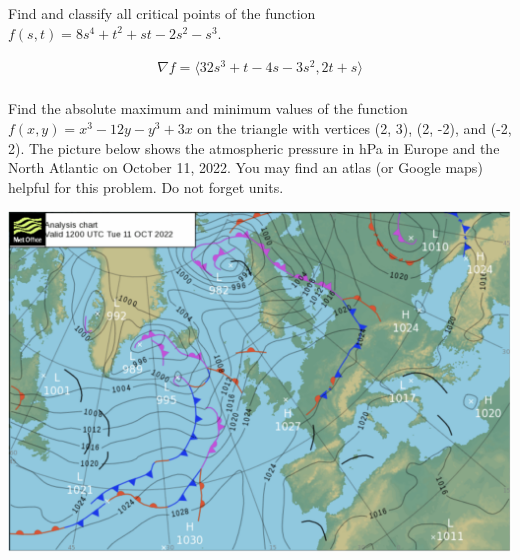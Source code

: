 \documentclass[12pt]{exam}
\begin{document}
\begin{questions}
\question Find and classify all critical points of the function $f (s, t) = 8s^4 + t^2 + st - 2s^2 - s^3$.
	\begin{solution}
		\begin{gather*}
			\nabla f = \langle 32s^3 + t - 4s - 3s^2, 2t + s \rangle \\
		\end{gather*}
	\end{solution}
\question Find the absolute maximum and minimum values of the function $f (x, y) = x^3 - 12y - y^3 + 3x$ on the triangle with vertices (2, 3), (2, -2), and (-2, 2).
\question The picture below shows the atmospheric pressure in hPa in Europe and the North Atlantic on October 11, 2022. You may find an atlas (or Google maps) helpful for this problem. Do not forget units.
\begin{center}
    \includegraphics*[scale=0.3]{images/05-map.png}
\end{center}
\end{questions}
\end{document}
